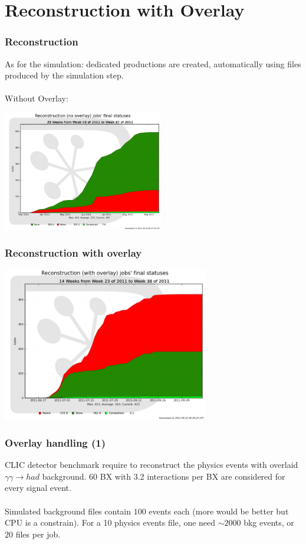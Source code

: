 \documentclass{beamer}
\begin{document}
\section{Reconstruction with Overlay}
\begin{frame}
\frametitle{Reconstruction}
 As for the simulation: dedicated productions are created, automatically using files produced by the simulation step.\\
~\\
Without Overlay:\\
\begin{center}
\includegraphics[width=7cm]{RecoNoOverlayStatus}
\end{center}
\end{frame}
\begin{frame}
\frametitle{Reconstruction with overlay}
\begin{center}
\includegraphics[width=9cm]{RecoOverlayStatus} 
\end{center}
\end{frame}
\begin{frame}
\frametitle{Overlay handling (1)}
CLIC detector benchmark require to reconstruct the physics events with overlaid $\gamma\gamma \to had$ background. \alert{60 BX with 3.2 interactions per BX are considered for every signal event}.\\
~\\
Simulated background files contain $100$ events each (more would be better but CPU is a constrain). For a 10 physics events file, one need $\sim 2000$ bkg events, or \alert{$20$ files per job}.
\end{frame}
\end{document}
